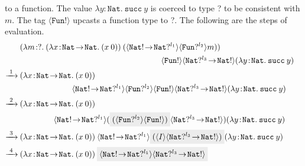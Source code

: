 to a function. The value $\lambda y \! : \! \texttt{Nat} . \: \texttt{succ} \: y$ is coerced to type ? to 
be consistent with $m$. The tag $\langle \texttt{Fun}! \rangle$ upcasts a function type to ?.
The following are the steps of evaluation.
\begin{align*}
    & (\lambda m \! :? . \: (\lambda x \! : \! \texttt{Nat} \! \rightarrow \! \texttt{Nat} . \: 
    (x \: 0)) \: (\langle \texttt{Nat}! \! \rightarrow \! \texttt{Nat}? ^{l_1} \rangle \langle \texttt{Fun}? ^{l_2} \rangle m)) & \\
    & \hspace{6.1cm} \: \langle \texttt{Fun}! \rangle \langle \texttt{Nat}? ^{l_3} \! \rightarrow \! \texttt{Nat}! \rangle 
    (\lambda y \! : \! \texttt{Nat} . \: \texttt{succ} \: y) \\
    \xrightarrow{\text{ 1 }} \:
    &  (\lambda x \! : \! \texttt{Nat} \! \rightarrow \! \texttt{Nat} . \: 
    (x \: 0)) & \\ 
    & \hspace{2.2cm} \: \langle \texttt{Nat}! \! \rightarrow \! \texttt{Nat}? ^{l_1} \rangle \langle \texttt{Fun}? ^{l_2} \rangle 
    \langle \texttt{Fun}! \rangle \langle \texttt{Nat}? ^{l_3} \! \rightarrow \! \texttt{Nat}! \rangle 
    (\lambda y \! : \! \texttt{Nat} . \: \texttt{succ} \: y) \\
    \xrightarrow{\text{ 2 }} \:    
    & (\lambda x \! : \! \texttt{Nat} \! \rightarrow \! \texttt{Nat} . \: 
    (x \: 0)) & \\ 
    & \hspace{1.4cm} \: \langle \texttt{Nat}! \! \rightarrow \! \texttt{Nat}? ^{l_1} \rangle (\highlight{(\langle \texttt{Fun}? ^{l_2} \rangle 
    \langle \texttt{Fun}! \rangle)} \langle \texttt{Nat}? ^{l_3} \! \rightarrow \! \texttt{Nat}! \rangle) 
    (\lambda y \! : \! \texttt{Nat} . \: \texttt{succ} \: y) \\
    \xrightarrow{\text{ 3 }} \:
    & (\lambda x \! : \! \texttt{Nat} \! \rightarrow \! \texttt{Nat} . \: 
    (x \: 0)) \: \langle \texttt{Nat}! \! \rightarrow \! \texttt{Nat}? ^{l_1} \rangle \highlight{(\langle I \rangle
     \langle \texttt{Nat}? ^{l_3} \! \rightarrow \! \texttt{Nat}! \rangle)} 
    (\lambda y \! : \! \texttt{Nat} . \: \texttt{succ} \: y) \\
    \xrightarrow{\text{ 4 }} \:
    & (\lambda x \! : \! \texttt{Nat} \! \rightarrow \! \texttt{Nat} . \: 
    (x \: 0)) \: \highlight{\langle \texttt{Nat}! \! \rightarrow \! \texttt{Nat}? ^{l_1} \rangle 
     \langle \texttt{Nat}? ^{l_3} \! \rightarrow \! \texttt{Nat}! \rangle}

\end{align*}
